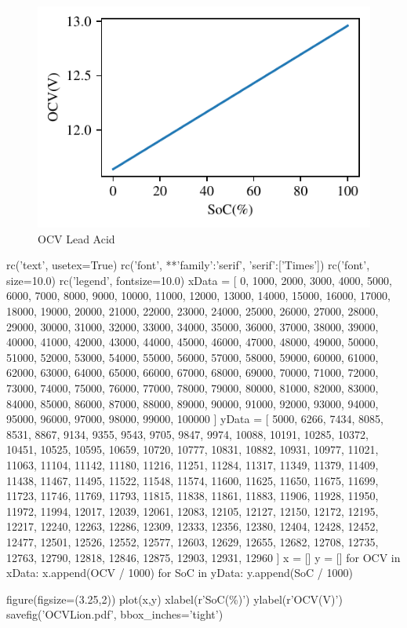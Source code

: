 \begin{figure}[!ht]
\centering
\includegraphics{OCVlead}
\caption{\label{fig:OCVLead} OCV Lead Acid }
\end{figure}



\begin{pylabcode}[plotsession]
rc('text', usetex=True)
rc('font', **{'family':'serif', 'serif':['Times']})
rc('font', size=10.0)			
rc('legend', fontsize=10.0)
xData = [ 0, 1000, 2000, 3000, 4000, 5000, 6000, 7000, 8000, 9000, 10000, 11000, 12000, 13000, 14000, 15000, 16000, 17000, 18000, 19000, 20000, 21000, 22000, 23000, 24000, 25000, 26000, 27000, 28000, 29000, 30000, 31000, 32000, 33000, 34000, 35000, 36000, 37000, 38000, 39000, 40000, 41000, 42000, 43000, 44000, 45000, 46000, 47000, 48000, 49000, 50000, 51000, 52000, 53000, 54000, 55000, 56000, 57000, 58000, 59000, 60000, 61000, 62000, 63000, 64000, 65000, 66000, 67000, 68000, 69000, 70000, 71000, 72000, 73000, 74000, 75000, 76000, 77000, 78000, 79000, 80000, 81000, 82000, 83000, 84000, 85000, 86000, 87000, 88000, 89000, 90000, 91000, 92000, 93000, 94000, 95000, 96000, 97000, 98000, 99000, 100000 ]
yData = [ 5000, 6266, 7434, 8085, 8531, 8867, 9134, 9355, 9543, 9705, 9847, 9974, 10088, 10191, 10285, 10372, 10451, 10525, 10595, 10659, 10720, 10777, 10831, 10882, 10931, 10977, 11021, 11063, 11104, 11142, 11180, 11216, 11251, 11284, 11317, 11349, 11379, 11409, 11438, 11467, 11495, 11522, 11548, 11574, 11600, 11625, 11650, 11675, 11699, 11723, 11746, 11769, 11793, 11815, 11838, 11861, 11883, 11906, 11928, 11950, 11972, 11994, 12017, 12039, 12061, 12083, 12105, 12127, 12150, 12172, 12195, 12217, 12240, 12263, 12286, 12309, 12333, 12356, 12380, 12404, 12428, 12452, 12477, 12501, 12526, 12552, 12577, 12603, 12629, 12655, 12682, 12708, 12735, 12763, 12790, 12818, 12846, 12875, 12903, 12931, 12960 ]
x = []
y = []
for OCV in xData:
    x.append(OCV / 1000)
for SoC in yData:
    y.append(SoC / 1000)
 
figure(figsize=(3.25,2))
plot(x,y)
xlabel(r'SoC(\%)')
ylabel(r'OCV(V)')
savefig('OCVLion.pdf', bbox_inches='tight')
\end{pylabcode}

